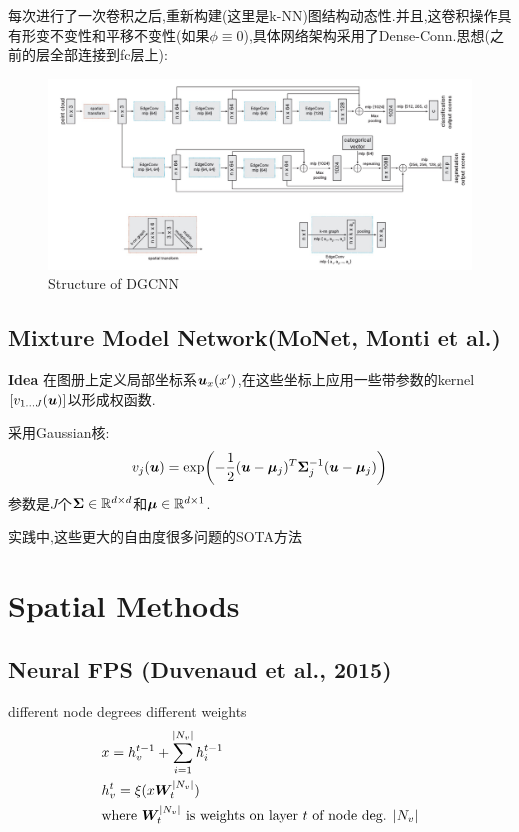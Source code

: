 \documentclass{article}
\begin{document}
\note 每次进行了一次卷积之后,重新构建(这里是k-NN)图结构\trarr 动态性.并且,这卷积操作具有形变不变性和平移不变性(如果$\phi \equiv 0$),具体网络架构采用了Dense-Conn.思想(之前的层全部连接到fc层上):
\begin{figure}[t]
    \centering
    \includegraphics[width=0.85\paperwidth]{dgcnn_structure.PNG}
    \caption{Structure of DGCNN}
\end{figure}



\subsection{Mixture Model Network(MoNet, Monti et al.)}

\textbf{Idea} 在图册上定义局部坐标系$\boldsymbol{u}_x(x')$,在这些坐标上应用一些带参数的kernel$[v_{1\dots J}(\boldsymbol{u})]$以形成权函数.

采用Gaussian核:
\begin{align}
    v_j(\boldsymbol{u})=\exp(-\frac{1}{2} (\boldsymbol{u} - \boldsymbol{\mu}_j)^T \boldsymbol{\Sigma}_j^{-1} (\boldsymbol{u} - \boldsymbol{\mu}_j))
\end{align}
参数是$J$个$\boldsymbol{\Sigma} \in \mathbb{R}^{d\times d}$和$\boldsymbol{\mu}\in \mathbb{R}^{d\times 1}$.

实践中,这些更大的自由度\tRarr 很多问题的SOTA方法

\section{Spatial Methods}

\subsection{Neural FPS (Duvenaud et al., 2015)}

 different node degrees \trarr different weights
\begin{align}
    &x=h_v^{t-1}+\sum_{i=1}^{|N_v|}h_i^{t-1}\\
    &h^t_v=\xi(x\boldsymbol{W}_t^{|N_v|})\\
    &\text{where }\boldsymbol{W}_t^{|N_v|} \text{ is weights on layer $t$ of node deg. $|N_v|$}
\end{align}
\end{document}
